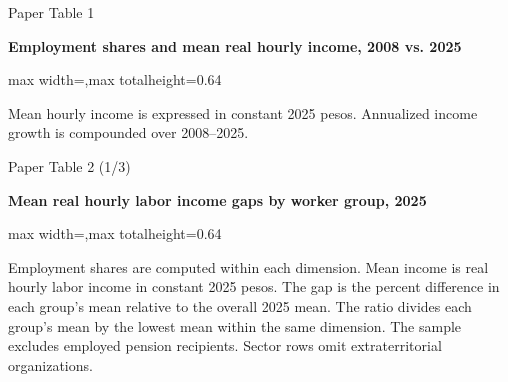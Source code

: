 \begin{frame}{Paper Table 1}
\begin{minipage}{\textwidth}\small\textbf{Employment shares and mean real hourly income, 2008 vs. 2025}\end{minipage}\par\vspace{0.15cm}
\centering\begingroup\fontsize{8.5}{10}\selectfont
\setlength{\tabcolsep}{4pt}\renewcommand{\arraystretch}{1.06}
\begin{adjustbox}{max width=\textwidth,max totalheight=0.64\textheight}

\end{adjustbox}\endgroup\par\vspace{0.10cm}
{\fontsize{6.5}{7.5}\selectfont\raggedright Mean hourly income is expressed in constant 2025 pesos. Annualized income growth is compounded over 2008--2025.\par}
\end{frame}

\begin{frame}{Paper Table 2 (1/3)}
\begin{minipage}{\textwidth}\small\textbf{Mean real hourly labor income gaps by worker group, 2025}\end{minipage}\par\vspace{0.15cm}
\centering\begingroup\fontsize{8.5}{10}\selectfont
\setlength{\tabcolsep}{4pt}\renewcommand{\arraystretch}{1.06}
\begin{adjustbox}{max width=\textwidth,max totalheight=0.64\textheight}

\end{adjustbox}\endgroup\par\vspace{0.10cm}
{\fontsize{6.5}{7.5}\selectfont\raggedright Employment shares are computed within each dimension. Mean income is real hourly labor income in constant 2025 pesos. The gap is the percent difference in each group's mean relative to the overall 2025 mean. The ratio divides each group's mean by the lowest mean within the same dimension. The sample excludes employed pension recipients. Sector rows omit extraterritorial organizations.\par}
\end{frame}

